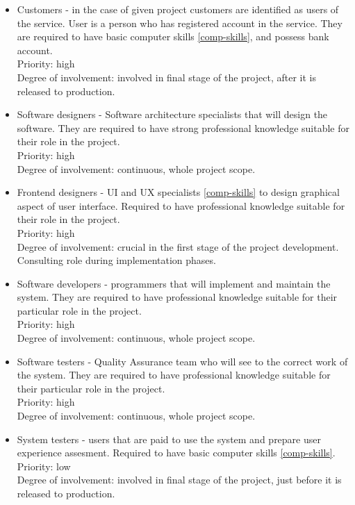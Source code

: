 \documentclass{scrreprt}
\begin{document}
\begin{itemize}
\item Customers - in the case of given project customers are identified as users of the service. User is a person who has registered account in the service. They are required to have basic computer skills \ref{comp-skills}, and possess bank account.
\\Priority: high
\\Degree of involvement: involved in final stage of the project, after it is released to production.

\item Software designers - Software architecture specialists that will design the software. They are required to have strong professional knowledge suitable for their role in the project.
\\Priority: high
\\Degree of involvement: continuous, whole project scope.

\item Frontend designers - UI and UX specialists \ref{comp-skills} to design graphical aspect of user interface. Required to have professional knowledge suitable for their role in the project.
\\Priority: high
\\Degree of involvement: crucial in the first stage of the project development. Consulting role during implementation phases.

\item Software developers - programmers that will implement and maintain the system. They are required to have professional knowledge suitable for their particular role in the project.
\\Priority: high
\\Degree of involvement: continuous, whole project scope.

\item Software testers - Quality Assurance team who will see to the correct work of the system. They are required to have professional knowledge suitable for their particular role in the project.
\\Priority: high
\\Degree of involvement: continuous, whole project scope.

\item System testers - users that are paid to use the system and prepare user experience assesment. Required to have basic computer skills \ref{comp-skills}.
\\Priority: low
\\Degree of involvement: involved in final stage of the project, just before it is released to production.


\end{itemize}
\end{document}
